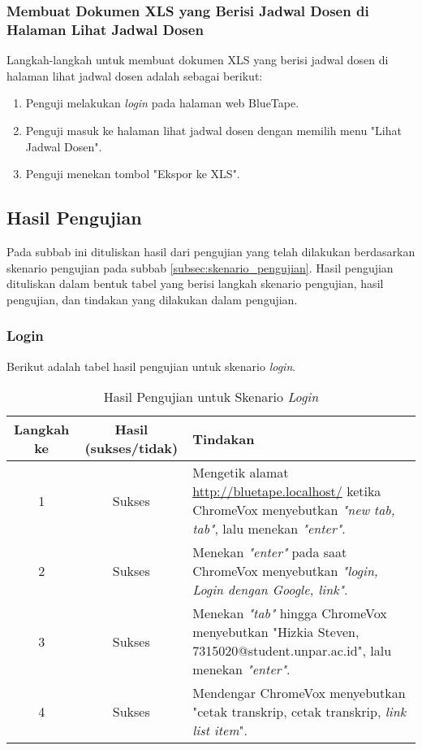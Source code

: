 \subsubsection{Membuat Dokumen XLS yang Berisi Jadwal Dosen di Halaman Lihat Jadwal Dosen}
\label{subsubsec:skenario_membuat_dokumen_xls_yang_berisi_jadwal_dosen_di_halaman_lihat_jadwal_dosen}
Langkah-langkah untuk membuat dokumen XLS yang berisi jadwal dosen di halaman lihat jadwal dosen adalah sebagai berikut:

\begin{enumerate}
    \item Penguji melakukan \textit{login} pada halaman web BlueTape.
    \item Penguji masuk ke halaman lihat jadwal dosen dengan memilih menu "Lihat Jadwal Dosen".
    \item Penguji menekan tombol "Ekspor ke XLS".
\end{enumerate}

\subsection{Hasil Pengujian}
\label{subsec:hasil_pengujian}
Pada subbab ini dituliskan hasil dari pengujian yang telah dilakukan berdasarkan skenario pengujian pada subbab \ref{subsec:skenario_pengujian}. Hasil pengujian dituliskan dalam bentuk tabel yang berisi langkah skenario pengujian, hasil pengujian, dan tindakan yang dilakukan dalam pengujian.

\subsubsection{Login}
\label{subsubsec:hasil_pengujian_login}
Berikut adalah tabel hasil pengujian untuk skenario \textit{login}.

\begin{table}[H]
    \centering 
    \caption{Hasil Pengujian untuk Skenario \textit{Login}}
    \label{tab:hasil_pengujian_login}
    \begin{tabular}{|c|c|p{10cm}|}
        \toprule
        Langkah ke & Hasil (sukses/tidak) & Tindakan \\

        \midrule
        1 & Sukses & Mengetik alamat \url{http://bluetape.localhost/} ketika ChromeVox menyebutkan \textit{"new tab, tab"}, lalu menekan \textit{"enter"}. \\
        2 & Sukses & Menekan \textit{"enter"} pada saat ChromeVox menyebutkan \textit{"login, Login dengan Google, link"}. \\
        3 & Sukses & Menekan \textit{"tab"} hingga ChromeVox menyebutkan "Hizkia Steven, 7315020@student.unpar.ac.id", lalu menekan \textit{"enter"}. \\
        4 & Sukses & Mendengar ChromeVox menyebutkan "cetak transkrip, cetak transkrip, \textit{link list item}". \\

        \bottomrule

    \end{tabular}
\end{table}

